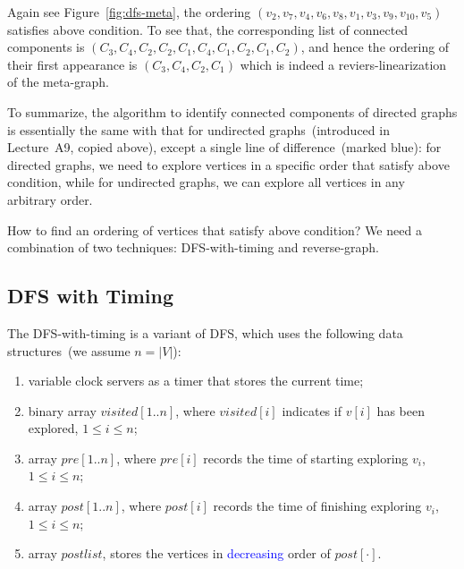 Again see Figure~\ref{fig:dfs-meta}, the ordering 
$( v_{2} ,v_{7} ,v_{4} ,v_{6} ,v_{8} ,v_{1} ,v_{3} ,v_{9} ,v_{10} ,v_{5})$ satisfies above condition.
To see that, the corresponding list of connected components is 
$(C_3, C_4, C_2, C_2, C_1, C_4, C_1, C_2, C_1, C_2)$,
and hence the ordering of their first appearance is $(C_3, C_4, C_2, C_1)$ which is indeed a reviers-linearization of the meta-graph.

\begin{algorithmblock}[0.8\textwidth]
	\xxx
	\xxx
	\xxx
	\xxx
	\xxx
	\xxx
\end{algorithmblock}

\begin{algorithmblock}[0.8\textwidth]
	\xxx
	\xxx
	\xxx
	\xxx
\end{algorithmblock}

To summarize, the algorithm to identify connected components of directed graphs
is essentially the same with that for undirected graphs~(introduced in Lecture~A9, copied above), 
except a single line of difference~(marked blue): for directed graphs,
we need to explore vertices in a specific order that satisfy above condition,
while for undirected graphs, we can explore all vertices in any arbitrary order.

How to find an ordering of vertices that satisfy above condition?
We need a combination of two techniques: DFS-with-timing and reverse-graph.



\subsection*{DFS with Timing}

The DFS-with-timing is a variant of DFS, which uses the following
data structures~(we assume $n = |V|$):

\begin{enumerate}
\item variable clock servers as a timer that stores the current time;
\item binary array $visited[1..n]$, where $visited[i]$ indicates if $v[i]$ has been explored, $1 \le i \le n$;
\item array $pre[1..n]$, where $pre[i]$ records the time of starting exploring $v_i$, $1 \le i \le n$;
\item array $post[1..n]$, where $post[i]$ records the time of finishing exploring $v_i$, $1 \le i \le n$;
\item array $postlist$, stores the vertices in \textcolor{blue}{decreasing} order of $post[\cdot]$.
\end{enumerate}

